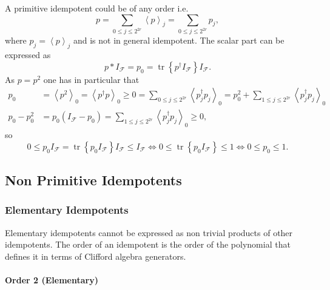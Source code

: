 \documentclass[aps,preprint]{revtex4}%
\begin{document}
A primitive idempotent could be of any order i.e.
\begin{equation}
p=\sum_{0\leq j\leq2^{2r}}\left\langle p\right\rangle _{j}=\sum_{0\leq
j\leq2^{2r}}p_{j},
\end{equation}
where $p_{j}=\left\langle p\right\rangle _{j}$ and is not in general
idempotent. The scalar part can be expressed as
\begin{equation}
p\ast I_{\mathcal{F}}=p_{0}=\operatorname*{tr}\left\{  p^{\dagger
}I_{\mathcal{F}}\right\}  I_{\mathcal{F}}.
\end{equation}
As $p=p^{2}$ one has in particular that
\begin{align}
p_{0}  &  =\left\langle p^{2}\right\rangle _{0}=\left\langle p^{\dagger
}p\right\rangle _{0}\geq0=\sum_{0\leq j\leq2^{2r}}\left\langle p_{j}^{\dagger
}p_{j}\right\rangle _{0}=p_{0}^{2}+\sum_{1\leq j\leq2^{2r}}\left\langle
p_{j}^{\dagger}p_{j}\right\rangle _{0}\\
p_{0}-p_{0}^{2}  &  =p_{0}\left(  I_{\mathcal{F}}-p_{0}\right)  =\sum_{1\leq
j\leq2^{2r}}\left\langle p_{j}^{\dagger}p_{j}\right\rangle _{0}\geq0,
\end{align}
so
\begin{equation}
0\leq p_{0}I_{\mathcal{F}}=\operatorname*{tr}\left\{  p_{0}I_{\mathcal{F}%
}\right\}  I_{\mathcal{F}}\leq I_{\mathcal{F}}\Leftrightarrow0\leq
\operatorname*{tr}\left\{  p_{0}I_{\mathcal{F}}\right\}  \leq1\Leftrightarrow
0\leq p_{0}\leq1.
\end{equation}


\subsection{Non Primitive Idempotents}

\subsubsection{Elementary Idempotents}

Elementary idempotents cannot be expressed as non trivial products of other
idempotents. The order of an idempotent is the order of the polynomial that
defines it in terms of Clifford algebra generators.

\paragraph{ Order 2 (Elementary)}%
\end{document}
